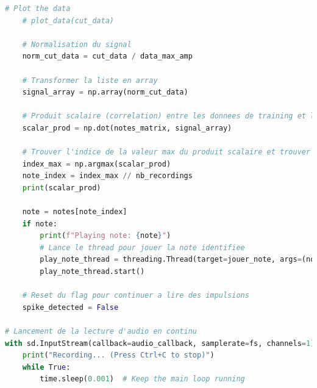 \documentclass[11pt,letterpaper]{article}
\begin{document}
\begin{lstlisting}[language=python]
    # Plot the data
    # plot_data(cut_data)

    # Normalisation du signal
    norm_cut_data = cut_data / data_max_amp

    # Transformer la liste en array
    signal_array = np.array(norm_cut_data)

    # Produit scalaire (correlation) entre les donnees de training et le signal test
    scalar_prod = np.dot(notes_matrix, signal_array)

    # Trouver l'indice de la valeur max du produit scalaire et trouver sa note correspondante
    index_max = np.argmax(scalar_prod)
    note_index = index_max // nb_recordings
    print(scalar_prod)

    note = notes[note_index]
    if note:
        print(f"Playing note: {note}")
        # Lance le thread pour jouer la note identifiee
        play_note_thread = threading.Thread(target=jouer_note, args=(note,))
        play_note_thread.start()
    
    # Reset du flag pour continuer a lire des impulsions
    spike_detected = False

# Lancement de la lecture d'audio en continu
with sd.InputStream(callback=audio_callback, samplerate=fs, channels=1):
    print("Recording... (Press Ctrl+C to stop)")
    while True:
        time.sleep(0.001)  # Keep the main loop running
\end{lstlisting}


\clearpage
\printbibliography
% 
% 
\end{document}
